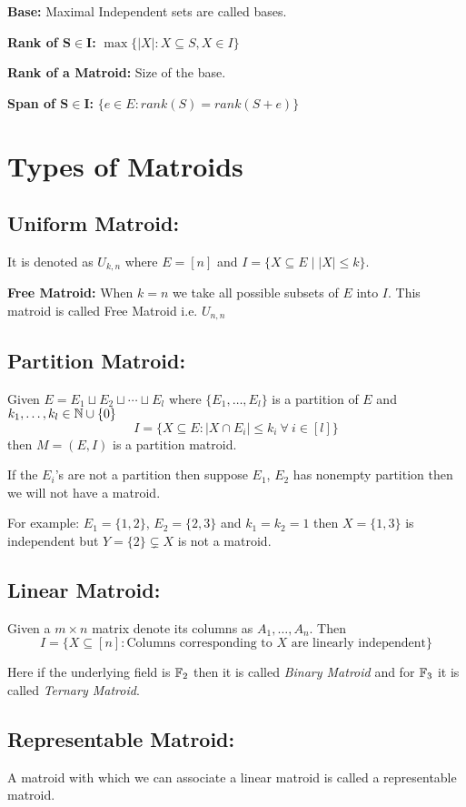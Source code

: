 \documentclass{article}
\begin{document}
\textbf{Base:} Maximal Independent sets are called bases.

\textbf{Rank of $\boldsymbol{S\in I}$:} $\max\{|X|\colon X\subseteq S, X\in I\}$

\textbf{Rank of a Matroid:} Size of the base.

\textbf{Span of $\boldsymbol{S\in I}$:} $\{e\in E\colon rank(S)=rank(S+e)\}$

\section{Types of Matroids}
	\subsection{{Uniform Matroid:} }It is {denoted as $U_{k,n}$ where $E=[n]$ and $I=\{X\subseteq E\mid |X|\leq k\}$.}
	
	
	\textbf{Free Matroid: }When $k=n$ we take all possible subsets of $E$ into $I$. This matroid is called {Free Matroid} i.e. $U_{n,n}$\parinn
	
	\subsection{Partition Matroid:} Given $E=E_1\sqcup E_2\sqcup \cdots \sqcup E_l$ where $\{E_1,\dots, E_l\}$ is a partition of $E$ and $k_1,\dots,k_l\in \mathbb{N}\cup \{0\}$ $$I=\{X\subseteq E\colon |X\cap E_i|\leq k_i\ \forall \ i\in[l]\}$$then $M=(E,I)$ is a partition matroid.
	\begin{note}
		If the $E_i$'s are not a partition then suppose $E_1$, $E_2$ has nonempty partition then we will not have a matroid. 
		
		For example: $E_1=\{1,2\}$, $E_2=\{2,3\}$ and $k_1=k_2=1$ then $X=\{1,3\}$ is independent but $Y=\{2\}\subsetneq X$ is not a matroid. 
	\end{note}
	
	\subsection{Linear Matroid:} Given a $m\times n$ matrix denote its columns as $A_1,\dots, A_n$. Then $$I=\{ X\subseteq [n]\colon \text{Columns corresponding to $X$ are linearly independent}  \}$$\parinn
	
	Here if the underlying field is $\mathbb{F}_2$ then it is called \textit{Binary Matroid} and for $\mathbb{F}_3$ it is called \textit{Ternary Matroid}.
	
	\subsection{Representable Matroid:} A matroid with which we can associate a linear matroid is called a representable matroid.
	
\end{document}
